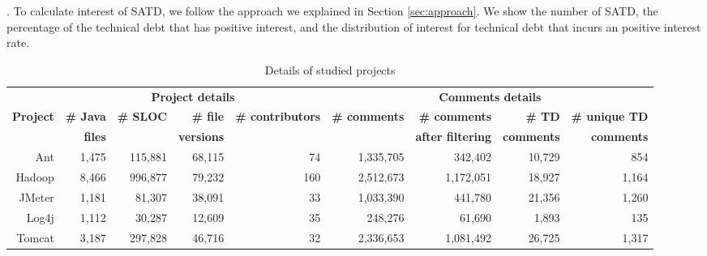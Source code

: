 \documentclass[10pt, conference]{IEEEtran}
\newcommand{\smallsection}[1]{\vspace{1mm}\noindent {\bf #1}.\hspace{2mm}}
\begin{document}
\smallsection{Approach}
To calculate interest of SATD, we follow the approach we explained in Section \ref{sec:approach}.
We show the number of SATD, the percentage of the technical debt that has positive interest, and the distribution of interest for technical debt that incurs an positive interest rate.

\begin{table}[tb]
  \caption{Details of studied projects}
  \label{tab:projects}
  \centering

  \begin{tabular}{r|rrrr|rrrr}
  \hline
\textbf{} & \multicolumn{4}{c|}{\textbf{Project details}} & \multicolumn{4}{c}{\textbf{Comments details}} \\ \cline{2-9}
\textbf{Project} & \textbf{\# Java} & \textbf{\# SLOC} & \textbf{\# file} & \textbf{\# contributors} & \textbf{\# comments} & \textbf{\# comments} & \textbf{\# TD} & \textbf{\# unique TD} \\
\textbf{} & \textbf{files} & & \textbf{versions} & & & \textbf{after filtering} & \textbf{ comments} & \textbf{comments} \\
  \hline
Ant        &1,475 & 115,881 & 68,115 & 74 & 1,335,705 & 342,402 & 10,729 &  854  \\
Hadoop     &8,466 & 996,877 & 79,232 &160 & 2,512,673 & 1,172,051 & 18,927 & 1,164 \\
JMeter     &1,181 & 81,307  & 38,091 & 33 & 1,033,390 & 441,780 & 21,356 & 1,260 \\
Log4j      &1,112 & 30,287  & 12,609 & 35 &   248,276 &  61,690 &  1,893 &   135 \\
Tomcat     &3,187 & 297,828 & 46,716 & 32 & 2,336,653 & 1,081,492 & 26,725 & 1,317 \\
  \hline
  \end{tabular}
\end{table}
\end{document}
